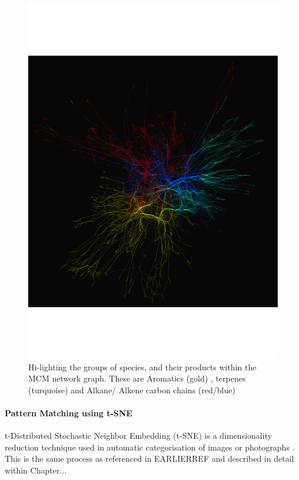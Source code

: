     \begin{figure}[H]
         \centering
    \includegraphics[width=\textwidth,trim={0 4cm 0 4cm},angle=-90]{figures_c1/beijingtest/graphgroups.pdf}
     \caption{Hi-lighting the groups of species, and their products within the MCM network graph. These are {\color{DarkGoldenrod} Aromatics (gold)} , {\color{DarkTurquoise} terpenes (turquoise) } and {\color{OrangeRed} Alkane}/{\color{RoyalBlue} Alkene  } carbon chains (red/blue)}
     \label{fig:colour}
     \end{figure}

\paragraph{Pattern Matching using t-SNE}
t-Distributed Stochastic Neighbor Embedding (t-SNE) is a dimensionality reduction technique used in automatic categorisation of images or photographs \cite{truthandbeauty,sketchy}. This is the same process as referenced in EARLIERREF and described in detail within Chapter... 

